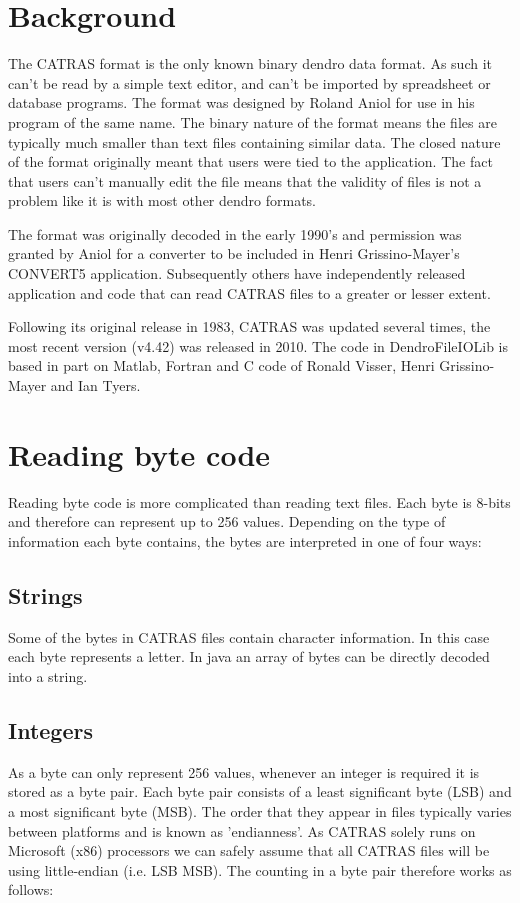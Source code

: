 \section{Background}
The CATRAS format \citep{catras} is the only known binary dendro data format. As such it can't be read by a simple text editor, and can't be imported by spreadsheet or database programs. The format was designed by Roland Aniol for use in his program of the same name. The binary nature of the format means the files are typically much smaller than text files containing similar data. The closed nature of the format originally meant that users were tied to the application.  The fact that users can't manually edit the file means that the validity of files is not a problem like it is with most other dendro formats.

The format was originally decoded in the early 1990's and permission was granted by Aniol for a converter to be included in Henri Grissino-Mayer's CONVERT5 application. Subsequently others have independently released application and code that can read CATRAS files to a greater or lesser extent. 

Following its original release in 1983, CATRAS was updated several times, the most recent version (v4.42) was released in 2010. The code in DendroFileIOLib is based in part on Matlab, Fortran and C code of Ronald Visser, Henri Grissino-Mayer and Ian Tyers. 

\section{Reading byte code}

Reading byte code is more complicated than reading text files. Each byte is 8-bits and therefore can represent up to 256 values. Depending on the type of information each byte contains, the bytes are interpreted in one of four ways: 

\subsection{Strings} Some of the bytes in CATRAS files contain character information. In this case each byte represents a letter. In java an array of bytes can be directly decoded into a string. 

\subsection{Integers} As a byte can only represent 256 values, whenever an integer is required it is stored as a byte pair. Each byte pair consists of a least significant byte (LSB) and a most significant byte (MSB). The order that they appear in files typically varies between platforms and is known as 'endianness'. As CATRAS solely runs on Microsoft (x86) processors we can safely assume that all CATRAS files will be using little-endian (i.e. LSB MSB). The counting in a byte pair therefore works as follows: 

